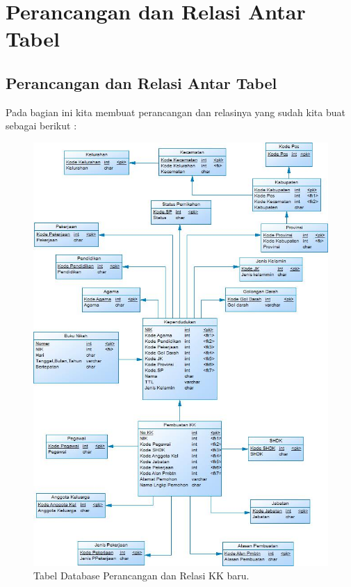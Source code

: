 \chapter{Perancangan dan Relasi Antar Tabel}

\section{Perancangan dan Relasi Antar Tabel}
Pada bagian ini kita membuat perancangan dan relasinya yang sudah kita buat sebagai berikut : 
\begin{figure}[H]
	\centering
	\includegraphics[width=12cm]{figures/poligami.jpg}
	\caption{Tabel Database Perancangan dan Relasi KK baru.}
\end{figure}

